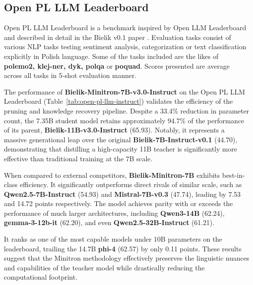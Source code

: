 \documentclass{article}
\begin{document}
\subsection{Open PL LLM Leaderboard}
Open PL LLM Leaderboard is a benchmark inspired by Open LLM Leaderboard \cite{open-llm-leaderboard} and described in detail in the Bielik v0.1 paper \cite{Ociepa_Flis_Wrobel_Gwozdziej_Kinas_2025}. Evaluation tasks consist of various NLP tasks testing sentiment analysis, categorization or text classification explicitly in Polish language. Some of the tasks included are the likes of \textbf{polemo2, klej-ner, dyk, polqa} or \textbf{poquad}. Scores presented are average across all tasks in 5-shot evaluation manner. 

The performance of \textbf{Bielik-Minitron-7B-v3.0-Instruct} on the Open PL LLM Leaderboard (Table~\ref{tab:open-pl-llm-instruct}) validates the efficiency of the pruning and knowledge recovery pipeline. Despite a 33.4\% reduction in parameter count, the 7.35B student model retains approximately 94.7\% of the performance of its parent, \textbf{Bielik-11B-v3.0-Instruct} (65.93). Notably, it represents a massive generational leap over the original \textbf{Bielik-7B-Instruct-v0.1} (44.70), demonstrating that distilling a high-capacity 11B teacher is significantly more effective than traditional training at the 7B scale.

When compared to external competitors, \textbf{Bielik-Minitron-7B} exhibits best-in-class efficiency. It significantly outperforms direct rivals of similar scale, such as \textbf{Qwen2.5-7B-Instruct} (54.93) and \textbf{Mistral-7B-v0.3} (47.74), leading by 7.53 and 14.72 points respectively. The model achieves parity with or exceeds the performance of much larger architectures, including \textbf{Qwen3-14B} (62.24), \textbf{gemma-3-12b-it} (62.20), and even \textbf{Qwen2.5-32B-Instruct} (61.21). 

It ranks as one of the most capable models under 10B parameters on the leaderboard, trailing the 14.7B \textbf{phi-4} (62.57) by only 0.11 points. These results suggest that the Minitron methodology effectively preserves the linguistic nuances and capabilities of the teacher model while drastically reducing the computational footprint.
\end{document}
